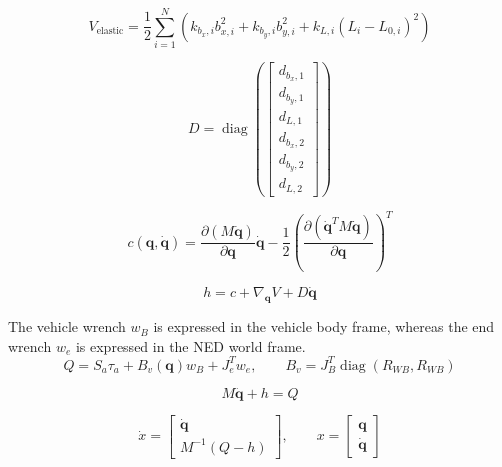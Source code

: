 \documentclass[11pt]{article}
\begin{document}
\begin{equation}
V_{\mathrm{elastic}}=\frac12\sum_{i=1}^{N}\left(k_{b_x,i}b_{x,i}^{2}+k_{b_y,i}b_{y,i}^{2}+k_{L,i}(L_i-L_{0,i})^2\right)
\end{equation}

\begin{equation}
D=\operatorname{diag}\!\left(\begin{bmatrix}d_{b_x,1}\\d_{b_y,1}\\d_{L,1}\\d_{b_x,2}\\d_{b_y,2}\\d_{L,2}\end{bmatrix}\right)
\end{equation}

\begin{equation}
c(\boldsymbol q,\dot{\boldsymbol q})=\frac{\partial(M\dot{\boldsymbol q})}{\partial\boldsymbol q}\dot{\boldsymbol q}-\frac12\left(\frac{\partial(\dot{\boldsymbol q}^{T}M\dot{\boldsymbol q})}{\partial\boldsymbol q}\right)^T
\end{equation}

\begin{equation}
h=c+\nabla_{\boldsymbol q}V+D\dot{\boldsymbol q}
\end{equation}

The vehicle wrench $w_B$ is expressed in the vehicle body frame, whereas the end wrench $w_e$ is expressed in the NED world frame.
\begin{equation}
Q=S_a\tau_a+B_v(\boldsymbol q)w_B+J_e^Tw_e,\qquad B_v=J_B^T\operatorname{diag}(R_{WB},R_{WB})
\end{equation}

\begin{equation}
M\ddot{\boldsymbol q}+h=Q\label{eq:dynamics}
\end{equation}

\begin{equation}
\dot x=\begin{bmatrix}\dot{\boldsymbol q}\\M^{-1}(Q-h)\end{bmatrix},\qquad x=\begin{bmatrix}\boldsymbol q\\\dot{\boldsymbol q}\end{bmatrix}
\end{equation}
\end{document}
